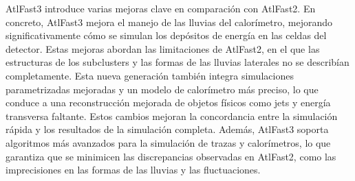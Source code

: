 AtlFast3 introduce varias mejoras clave en comparación con AtlFast2. En concreto, AtlFast3 mejora el manejo de las lluvias del calorímetro, mejorando significativamente cómo se simulan los depósitos de energía en las celdas del detector. Estas mejoras abordan las limitaciones de AtlFast2, en el que las estructuras de los subclusters y las formas de las lluvias laterales no se describían completamente. Esta nueva generación también integra simulaciones parametrizadas mejoradas y un modelo de calorímetro más preciso, lo que conduce a una reconstrucción mejorada de objetos físicos como jets y energía transversa faltante. Estos cambios mejoran la concordancia entre la simulación rápida y los resultados de la simulación completa.
Además, AtlFast3 soporta algoritmos más avanzados para la simulación de trazas y calorímetros, lo que garantiza que se minimicen las discrepancias observadas en AtlFast2, como las imprecisiones en las formas de las lluvias y las fluctuaciones.